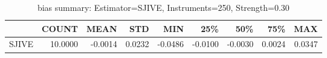 \begin{table}[ht]
\centering
\caption{bias summary: Estimator=SJIVE, Instruments=250, Strength=0.30}
\begin{tabular}{lrrrrrrrr}
\toprule
 & COUNT & MEAN & STD & MIN & 25\% & 50\% & 75\% & MAX \\
\midrule
SJIVE & 10.0000 & -0.0014 & 0.0232 & -0.0486 & -0.0100 & -0.0030 & 0.0024 & 0.0347 \\
\bottomrule
\end{tabular}
\end{table}
